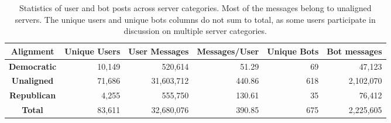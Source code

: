 \begin{table*}[H]
\small
\centering
\begin{tabular}{crrrrr} \toprule
\textbf{Alignment} & \textbf{Unique Users} & \textbf{User Messages} & \textbf{Messages/User} & \textbf{Unique Bots} & \textbf{Bot messages} \\ \midrule
\textbf{Democratic}    & 10,149                & 520,614                & 51.29                  & 69                   & 47,123                \\
\textbf{Unaligned} & 71,686                & 31,603,712             & 440.86                 & 618                  & 2,102,070             \\
\textbf{Republican}   & 4,255                 & 555,750                & 130.61                 & 35                   & 76,412                \\
\textbf{Total}   & 83,611                & 32,680,076             & 390.85                 & 675                  & 2,225,605             \\ \bottomrule
\end{tabular}
\caption{Statistics of user and bot posts across server categories. Most of the messages belong to unaligned servers. The unique users and unique bots columns do not sum to total, as some users participate in discussion on multiple server categories.}
\label{tab:statistics}
\end{table*}